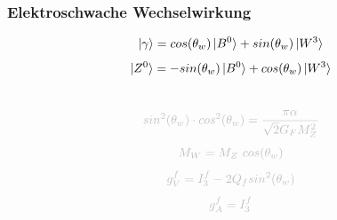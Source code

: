 \begin{frame}
	\frametitle{Elektroschwache Wechselwirkung}
	\begin{center}
		\begin{equation*}
			\ket{\gamma} =  cos(\theta_w)\ket{B^0} + sin(\theta_w) \ket{W^3}
		\end{equation*}
		\begin{equation*}
		\ket{Z^0} = -sin(\theta_w) \ket{B^0} + cos(\theta_w) \ket{W^3}
		\end{equation*}\\
		\begin{equation*}
		\textcolor{lightgray}{sin^2(\theta_w)\cdot cos^2(\theta_w) = \frac{\pi\alpha}{\sqrt{2}G_FM_Z^2}}
		\end{equation*}
		\begin{equation*}
		\textcolor{lightgray}{M_W = M_Z~cos(\theta_w)}
		\end{equation*}
		\begin{equation*}
		\textcolor{lightgray}{g_V^f = I^f_3-2 Q_f sin^2(\theta_w)}
		\end{equation*}
		\begin{equation*}
		\textcolor{lightgray}{g_A^f = I^f_3}
		\end{equation*}
	\end{center}
\end{frame}
